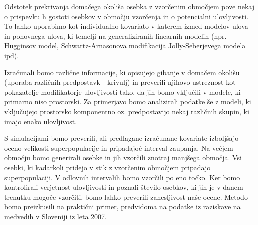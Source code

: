 \documentclass[a4paper]{article}
\begin{document}
Odstotek prekrivanja domačega okoliša osebka z vzorčenim območjem pove nekaj o prispevku h gostoti osebkov v območju vzorčenja in o potencialni ulovljivosti. To lahko uporabimo kot individualno kovariato v katerem izmed modelov ulova in ponovnega ulova, ki temelji na generaliziranih linearnih modelih (npr. Hugginsov model, Schwartz-Arnasonova modifikacija Jolly-Seberjevega modela ipd).


Izračunali bomo različne informacije, ki opisujejo gibanje v domačem okolišu (uporaba različnih predpostavk - krivulj) in preverili njihovo ustreznost kot pokazatelje modifikatorje ulovljivosti tako, da jih bomo vključili v modele, ki primarno niso prostorski. Za primerjavo bomo analizirali podatke še z modeli, ki vključujejo prostorsko komponentno oz. predpostavijo nekaj različnih skupin, ki imajo enako ulovljivost. %

S simulacijami bomo preverili, ali predlagane izračunane kovariate izboljšajo oceno velikosti superpopulacije in pripadajoč interval zaupanja. Na večjem območju bomo generirali osebke in jih vzorčili znotraj manjšega območja. Vsi osebki, ki kadarkoli pridejo v stik z vzorčenim območjem pripadajo superpopulaciji. V odlovnih intervalih bomo vzorčili po eno točko. Ker bomo kontrolirali verjetnost ulovljivosti in poznali število osebkov, ki jih je v danem trenutku mogoče vzorčiti, bomo lahko preverili zanesljivost naše ocene. Metodo bomo preizkusili na praktični primer, predvidoma na podatke iz raziskave na medvedih v Sloveniji iz leta 2007.
\end{document}
